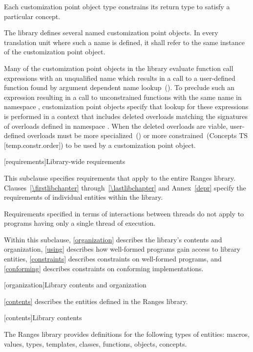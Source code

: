 \pnum
Each customization point object type constrains its return type
to satisfy a particular concept.

\pnum
The library defines several named customization point objects.
In every translation unit where such a name is defined, it shall
refer to the same instance of the customization point object.

\pnum
\enternote Many of the customization point objects in the library
evaluate function call expressions with an unqualified name which
results in a call to a user-defined function found by argument
dependent name lookup~(). To preclude
such an expression resulting in a call to unconstrained functions
with the same name in namespace , customization point
objects specify that lookup for these expressions is performed in
a context that includes deleted overloads matching the signatures
of overloads defined in namespace . When the deleted
overloads are viable, user-defined overloads must be more
specialized~() or more
constrained~(Concepts TS [temp.constr.order]) to be used by a
customization point object. \exitnote

[requirements]{Library-wide requirements}

\pnum
This subclause specifies requirements that apply to the entire Ranges library.
Clauses~\ref{\firstlibchapter} through~\ref{\lastlibchapter} and Annex~\ref{depr}
specify the requirements of individual entities within the library.

\pnum
Requirements specified in terms of interactions between threads do not apply to
programs having only a single thread of execution.

\pnum
Within this subclause, \ref{organization} describes the library's contents and
organization, \ref{using} describes how well-formed \Cpp programs gain access to
library entities, \ref{constraints} describes constraints on well-formed \Cpp
programs, and \ref{conforming} describes constraints on conforming
implementations.

[organization]{Library contents and organization}

\pnum
\ref{contents} describes the entities defined in the Ranges library.

[contents]{Library contents}

\pnum
The Ranges library provides definitions for the following types of entities:
macros, values, types, templates, classes, functions, objects, concepts.

